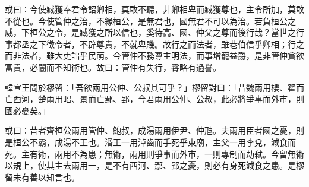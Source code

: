 \begin{pinyinscope}
或曰：今使臧獲奉君令詔卿相，莫敢不聽，非卿相卑而臧獲尊也，主令所加，莫敢不從也。今使管仲之治，不緣桓公，是無君也，國無君不可以為治。若負桓公之威，下桓公之令，是臧獲之所以信也，奚待高、國、仲父之尊而後行哉？當世之行事都丞之下徵令者，不辟尊貴，不就卑賤。故行之而法者，雖巷伯信乎卿相；行之而非法者，雖大吏詘乎民萌。今管仲不務尊主明法，而事增寵益爵，是非管仲貪欲富貴，必闇而不知術也。故曰：管仲有失行，霄略有過譽。

韓宣王問於樛留：「吾欲兩用公仲、公叔其可乎？」樛留對曰：「昔魏兩用樓、翟而亡西河，楚兩用昭、景而亡鄢、郢，今君兩用公仲、公叔，此必將爭事而外市，則國必憂矣。」

或曰：昔者齊桓公兩用管仲、鮑叔，成湯兩用伊尹、仲虺。夫兩用臣者國之憂，則是桓公不霸，成湯不王也。湣王一用淖齒而手死乎東廟，主父一用李兌，減食而死。主有術，兩用不為患；無術，兩用則爭事而外市，一則專制而劫弒。今留無術以規上，使其主去兩用一，是不有西河、鄢、郢之憂，則必有身死減食之患。是樛留未有善以知言也。


\end{pinyinscope}